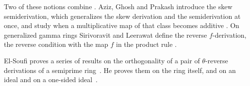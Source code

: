 Two of these notions combine \cite[p.~1]{AzizGhoshPrakash2024SkewSemi}. Aziz, Ghosh and Prakash introduce the skew
semiderivation, which generalizes the skew derivation and the semiderivation
at once, and study when a multiplicative map of that class becomes additive
\cite[Abstract]{AzizGhoshPrakash2024SkewSemi}. On generalized gamma rings
Sirivoravit and Leerawat define the reverse $f$-derivation, the reverse
condition with the map $f$ in the product rule
\cite[Abstract]{SirivoravitLeerawat2020}.

El-Soufi proves a series of results on the orthogonality of a pair of
$\theta$-reverse derivations of a semiprime ring~\cite{WlSemiprimeRingsAndOrthogonality2025}. He proves them on the ring
itself, and on an
ideal and on a one-sided ideal~\cite{WlSemiprimeRingsAndOrthogonality2025}.
